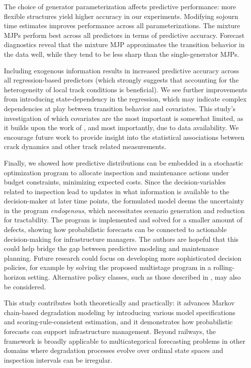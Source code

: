 \documentclass{article}
\begin{document}
The choice of generator parameterization affects predictive performance: more flexible structures yield higher accuracy in our experiments. Modifying sojourn time estimates improves performance across all parameterizations. 
The mixture MJPs perform best across all predictors in terms of predictive accuracy. Forecast diagnostics reveal that the mixture MJP approximates the transition behavior in the data well, while they tend to be less sharp than the single-generator MJPs.

Including exogenous information results in increased predictive accuracy across all regression-based predictors (which strongly suggests that accounting for the heterogeneity of local track conditions is beneficial). We see further improvements from introducing state-dependency in the regression, which may indicate complex dependencies at play between transition behavior and covariates. This study's investigation of which covariates are the most important is somewhat limited, as it builds upon the work of \citet{bisgaard2024A}, and most importantly, due to data availability. We encourage future work to provide insight into the statistical associations between crack dynamics and other track related measurements.

Finally, we showed how predictive distributions can be embedded in a stochastic optimization program to allocate inspection and maintenance actions under budget constraints, minimizing expected costs. 
Since the decision-variables related to inspection lead to updates in what information is available to the decision-maker at later time points, the formulated model deems the uncertainty in the program \textit{endogenous}, which necessitates scenario generation and reduction for tractability.
The program is implemented and solved for a smaller amount of defects, showing how probabilistic forecasts can be connected to actionable decision-making for infrastructure managers. The authors are hopeful that this could help bridge the gap between predictive modeling and maintenance planning.  Future research could focus on developing more sophisticated decision policies, for example by solving the proposed multistage program in a rolling-horizon setting. Alternative policy classes, such as those described in \citet{powell2018a}, may also be considered.



This study contributes both theoretically and practically: it advances Markov chain-based degradation modeling by introducing various model specifications and scoring-rule-consistent estimation, and it demonstrates how probabilistic forecasts can support infrastructure management. Beyond railways, the framework is broadly applicable to multicategorical forecasting problems in other domains where degradation processes evolve over ordinal state spaces and inspection intervals can be irregular.
\end{document}

